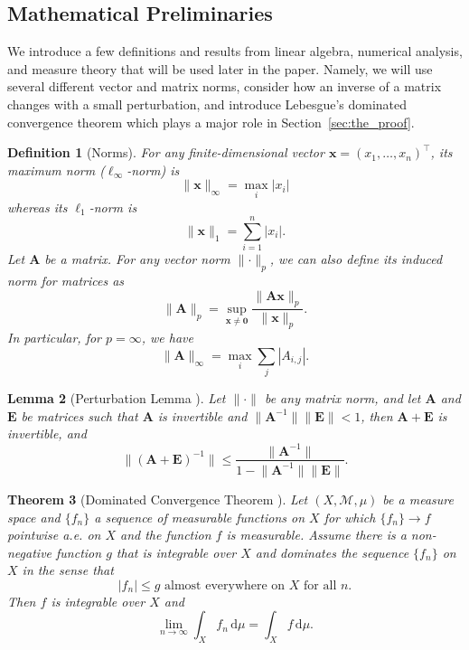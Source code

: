 \documentclass{mpaper}
\newtheorem{theorem}{Theorem}[section]
\newtheorem{lemma}[theorem]{Lemma}
\newtheorem{definition}[theorem]{Definition}
\begin{document}
\subsection{Mathematical Preliminaries} \label{sec:math_preliminaries}

We introduce a few definitions and results from linear algebra, numerical
analysis, and measure theory that will be used later in the paper. Namely, we
will use several different vector and matrix norms, consider how an inverse of a
matrix changes with a small perturbation, and introduce Lebesgue's dominated
convergence theorem which plays a major role in Section~\ref{sec:the_proof}.

\begin{definition}[Norms]
  For any finite-dimensional vector $\mathbf{x} = (x_1, \dots, x_n)^\intercal$,
  its \emph{maximum norm} (\emph{$\ell_\infty$-norm}) is
  \[
    \lVert \mathbf{x} \rVert_\infty = \max_i |x_i|
  \]
  whereas its \emph{$\ell_1$-norm} is
  \[
    \lVert \mathbf{x} \rVert_1 = \sum_{i = 1}^n |x_i|.
  \]
  Let $\mathbf{A}$ be a matrix. For any vector norm $\lVert
  \cdot \rVert_p$, we can also define its \emph{induced norm} for matrices as
  \[
    \lVert \mathbf{A} \rVert_p = \sup_{\mathbf{x} \ne \mathbf{0}} \frac{\lVert
      \mathbf{Ax} \rVert_p}{\lVert \mathbf{x} \rVert_p}.
  \]
  In particular, for $p = \infty$, we have
  \[
    \lVert \mathbf{A} \rVert_\infty = \max_i \sum_{j} |A_{i,j}|.
  \]
\end{definition}

\begin{lemma}[Perturbation Lemma
  \cite{layton2014numerical}] \label{lemma:perturbation}
  Let $\lVert \cdot \rVert$ be any matrix norm, and let $\mathbf{A}$ and
  $\mathbf{E}$ be matrices such that $\mathbf{A}$ is invertible and $\lVert
  \mathbf{A}^{-1} \rVert \lVert \mathbf{E} \rVert < 1$, then $\mathbf{A} +
  \mathbf{E}$ is invertible, and
  \[
    \lVert (\mathbf{A} + \mathbf{E})^{-1} \rVert \le \frac{\lVert
      \mathbf{A}^{-1} \rVert}{1 - \lVert \mathbf{A}^{-1} \rVert \lVert
      \mathbf{E} \rVert}.
  \]
\end{lemma}

\begin{theorem}[Dominated Convergence Theorem
  \cite{royden2010real}] \label{thm:lebesgue}
  Let $(X, \mathcal{M}, \mu)$ be a measure space and $\{ f_n \}$ a sequence of
  measurable functions on $X$ for which $\{ f_n \} \to f$ pointwise a.e. on $X$
  and the function $f$ is measurable. Assume there is a non-negative function
  $g$ that is integrable over $X$ and dominates the sequence $\{ f_n \}$ on $X$
  in the sense that
  \[
    |f_n| \le g \text{ almost everywhere on $X$ for all $n$.}
  \]
  Then $f$ is integrable over $X$ and
  \[
    \lim_{n \to \infty} \int_X f_n\,\mathrm{d}\mu = \int_X f\,\mathrm{d}\mu.
  \]
\end{theorem}
\end{document}
